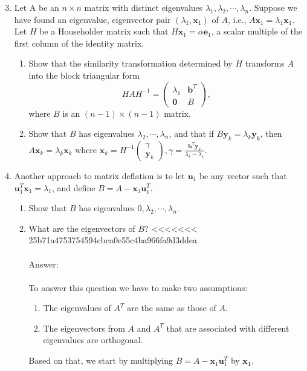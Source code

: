 \documentclass{article}
\renewcommand{\vec}[1]{\mathbf{#1}}
\begin{document}
\begin{enumerate}
\setcounter{enumi}{2}
\item Let A be an $n \times n$ matrix with distinct eigenvalues $\lambda_1, \lambda_2, \cdots, \lambda_n$.
Suppose we have found an eigenvalue, eigenvector pair $(\lambda_1,\vec{x}_1)$ of $A$, i.e., $A \vec{x}_1 = \lambda_1 \vec{x}_1$.  Let $H$ be a Householder matrix such that $H\vec{x}_1 =
\alpha \vec{e}_1$, a scalar multiple of the first column of the identity  matrix.  
\begin{enumerate}
\item Show that the similarity transformation determined by $H$ transforms $A$ into the block triangular form 
$$
H A H^{-1} = \begin{pmatrix} \lambda_1 & \vec{b}^T \\ \vec{0} & B \end{pmatrix},
$$
where $B$ is an $(n-1) \times (n-1)$ matrix.
\item Show that $B$ has eigenvalues $\lambda_2, \cdots, \lambda_n$, and that if $B\vec{y}_k = \lambda_k \vec{y}_k$, then $A \vec{x}_k = \lambda_k \vec{x}_k$ where $\vec{x}_k =
  H^{-1} \begin{pmatrix} \gamma \\ \vec{y}_k \end{pmatrix}, \gamma = \frac{\vec{b}^T\vec{y}_k}{\lambda_k-\lambda_1}.$
\end{enumerate}
\item Another approach to matrix deflation is to let $\vec{u}_1$ be any vector such that $\vec{u}_1^T\vec{x}_1 = \lambda_1$, and define $B = A - \vec{x}_1\vec{u}_1^T$.
\begin{enumerate}
\item Show that $B$ has eigenvalues $0, \lambda_2, \cdots, \lambda_n$.
\item What are the eigenvectors of $B$?
<<<<<<< 25b71a4753754594cbca0e55c4ba966fa9d3ddea
\\
\\
Answer:\\
\\
To answer this question we have to make two assumptions:
\begin{enumerate}
 \item The eigenvalues of $A^T$ are the same as those of $A$.
 \item The eigenvectors from $A$ and $A^T$ that are associated with different eigenvalues are orthogonal.
\end{enumerate}
Based on that, we start by multiplying $B = A - \vec{x}_1\vec{u}_1^T$ by $\vec{x_1}$,


\end{enumerate}
\end{enumerate}
\end{document}
